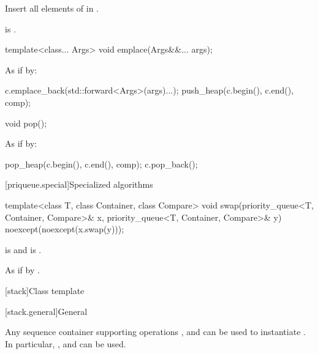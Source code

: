 \begin{itemdescr}
\pnum
\effects
Insert all elements of  in .

\pnum
\ensures
{} is .
\end{itemdescr}

%
\begin{itemdecl}
template<class... Args> void emplace(Args&&... args);
\end{itemdecl}

\begin{itemdescr}
\pnum
\effects
As if by:
\begin{codeblock}
c.emplace_back(std::forward<Args>(args)...);
push_heap(c.begin(), c.end(), comp);
\end{codeblock}
\end{itemdescr}


%
\begin{itemdecl}
void pop();
\end{itemdecl}

\begin{itemdescr}
\pnum
\effects
As if by:
\begin{codeblock}
pop_heap(c.begin(), c.end(), comp);
c.pop_back();
\end{codeblock}
\end{itemdescr}

[priqueue.special]{Specialized algorithms}

%
\begin{itemdecl}
template<class T, class Container, class Compare>
  void swap(priority_queue<T, Container, Compare>& x,
            priority_queue<T, Container, Compare>& y) noexcept(noexcept(x.swap(y)));
\end{itemdecl}

\begin{itemdescr}
\pnum
\constraints
{} is  and
 is .

\pnum
\effects
As if by .
\end{itemdescr}

[stack]{Class template }

[stack.general]{General}

\pnum
{}%
Any sequence container supporting operations
,
and
can be used to instantiate
.
In particular,
,
and
can be used.

